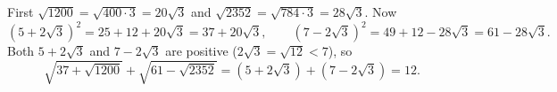 First $\sqrt{1200}=\sqrt{400\cdot3}=20\sqrt3$ and $\sqrt{2352}=\sqrt{784\cdot3}=28\sqrt3$. Now
\[\left(5+2\sqrt3\right)^2=25+12+20\sqrt3=37+20\sqrt3,\qquad\left(7-2\sqrt3\right)^2=49+12-28\sqrt3=61-28\sqrt3.\]
Both $5+2\sqrt3$ and $7-2\sqrt3$ are positive ($2\sqrt3=\sqrt{12}<7$), so
\[\sqrt{37+\sqrt{1200}}+\sqrt{61-\sqrt{2352}}=\left(5+2\sqrt3\right)+\left(7-2\sqrt3\right)=\boxed{12}.\]
